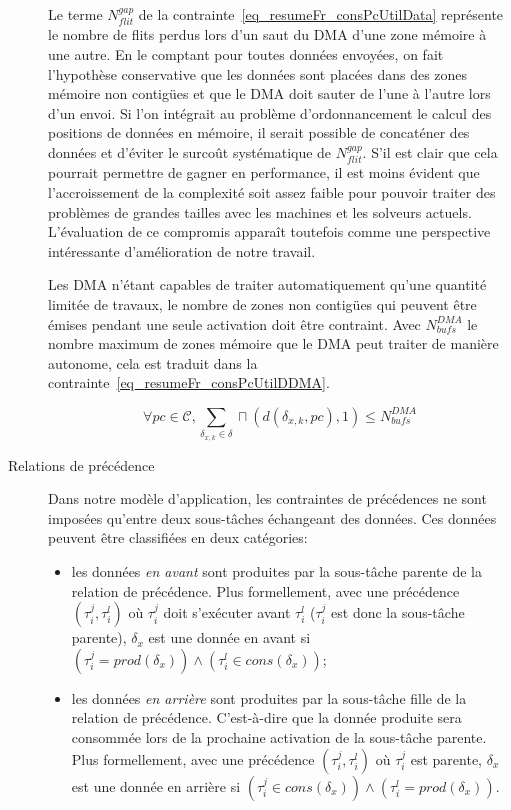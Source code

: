 \documentclass[main.tex]{subfiles}
\begin{document}
\begin{description}
        Le terme $N_{flit}^{gap}$ de la contrainte~\ref{eq_resumeFr_consPcUtilData} représente le nombre de flits perdus lors d'un saut du DMA d'une zone mémoire à une autre. En le comptant pour toutes données envoyées, on fait l'hypothèse conservative que les données sont placées dans des zones mémoire non contigües et que le DMA doit sauter de l'une à l'autre lors d'un envoi. Si l'on intégrait au problème d'ordonnancement le calcul des positions de données en mémoire, il serait possible de concaténer des données et d'éviter le surcoût systématique de $N_{flit}^{gap}$. S'il est clair que cela pourrait permettre de gagner en performance, il est moins évident que l'accroissement de la complexité soit assez faible pour pouvoir traiter des problèmes de grandes tailles avec les machines et les solveurs actuels. L'évaluation de ce compromis apparaît toutefois comme une perspective intéressante d'amélioration de notre travail.

        Les DMA n'étant capables de traiter automatiquement qu'une quantité limitée de travaux, le nombre de zones non contigües qui peuvent être émises pendant une seule activation doit être contraint. Avec $N_{bufs}^{DMA}$ le nombre maximum de zones mémoire que le DMA peut traiter de manière autonome, cela est traduit dans la contrainte~\ref{eq_resumeFr_consPcUtilDDMA}.

\begin{equation}
    \label{eq_resumeFr_consPcUtilDDMA}
    \forall pc \in \mathcal{C} , 
    \sum_{\delta_{x,k} \in \delta} \sqcap ( d(\delta_{x,k} , pc) , 1 ) \leq N_{bufs}^{DMA}
\end{equation}

    \item[Relations de précédence]
        Dans notre modèle d'application, les contraintes de précédences ne sont imposées qu'entre deux sous-tâches échangeant des données. Ces données peuvent être classifiées en deux catégories:
        \begin{itemize}
            \item les données \emph{en avant} sont produites par la sous-tâche parente de la relation de précédence. Plus formellement, avec une précédence $(\tau_i^j , \tau_i^l )$ où $\tau_i^j$ doit s'exécuter avant $\tau_i^l$ ($\tau_i^j$ est donc la sous-tâche parente), $\delta_x$ est une donnée en avant si $(\tau_i^j = prod(\delta_x)) \land (\tau_i^l \in cons(\delta_x))$;
            \item les données \emph{en arrière} sont produites par la sous-tâche fille de la relation de précédence. C'est-à-dire que la donnée produite sera consommée lors de la prochaine activation de la sous-tâche parente. Plus formellement, avec une précédence $(\tau_i^j , \tau_i^l )$ où $\tau_i^j$ est parente, $\delta_x$ est une donnée en arrière si $(\tau_i^j \in cons(\delta_x)) \land (\tau_i^l = prod(\delta_x))$.
        \end{itemize}
        

\end{description}
\end{document}
